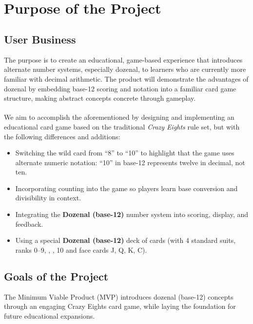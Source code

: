 \documentclass[12pt]{article}
\begin{document}
~\\

~\newpage
\section{Purpose of the Project}
\subsection{User Business}
The purpose is to create an educational, game-based experience that introduces alternate number systems, especially dozenal, to learners who are currently more familiar with decimal arithmetic. The product will demonstrate the advantages of dozenal by embedding base-12 scoring and notation into a familiar card game structure, making abstract concepts concrete through gameplay.\\
\\
We aim to accomplish the aforementioned by designing and implementing an educational card game based on the traditional \textit{Crazy Eights} rule set, but with the following differences and additions:
\begin{itemize}
    \item Switching the wild card from ``8'' to ``10'' to highlight that the game uses alternate numeric notation: ``10'' in base-12 represents twelve in decimal, not ten.
    \item Incorporating counting into the game so players learn base conversion and divisibility in context.
    \item Integrating the \textbf{Dozenal (base-12)} number system into scoring, display, and feedback.
    \item Using a special \textbf{Dozenal (base-12)} deck of cards (with 4 standard suits, ranks 0--9, , , 10 and face cards J, Q, K, C).
\end{itemize}

\subsection{Goals of the Project}
The Minimum Viable Product (MVP) introduces dozenal (base-12) concepts through an engaging Crazy Eights card game, while laying the foundation for future educational expansions.
\end{document}
